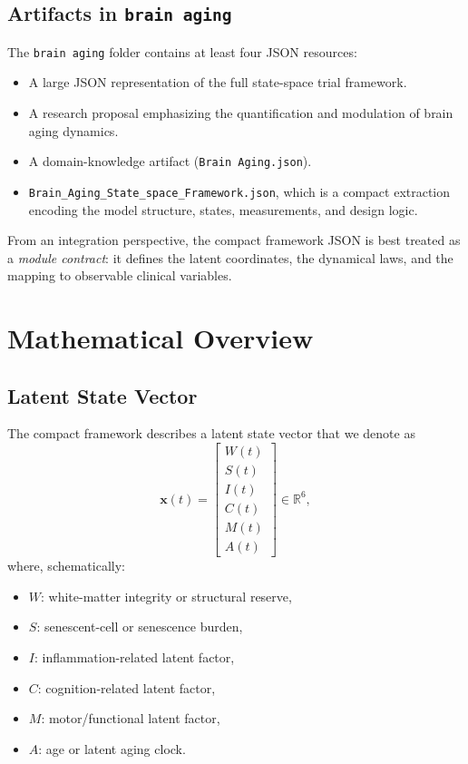 \documentclass[11pt]{article}
\begin{document}
\subsection{Artifacts in \texttt{brain aging}}

The \texttt{brain aging} folder contains at least four JSON resources:
\begin{itemize}[noitemsep]
  \item A large JSON representation of the full state-space trial framework.
  \item A research proposal emphasizing the quantification and modulation of brain
        aging dynamics.
  \item A domain-knowledge artifact (\texttt{Brain Aging.json}).
  \item \texttt{Brain\_Aging\_State\_space\_Framework.json}, which is a compact
        extraction encoding the model structure, states, measurements, and design
        logic.
\end{itemize}

From an integration perspective, the compact framework JSON is best treated as a
\emph{module contract}: it defines the latent coordinates, the dynamical laws, and
the mapping to observable clinical variables.

\section{Mathematical Overview}

\subsection{Latent State Vector}

The compact framework describes a latent state vector that we denote as
\[
  \bm{x}(t) =
  \begin{bmatrix}
    W(t) \\
    S(t) \\
    I(t) \\
    C(t) \\
    M(t) \\
    A(t)
  \end{bmatrix} \in \mathbb{R}^{6},
\]
where, schematically:
\begin{itemize}[noitemsep]
  \item \(W\): white-matter integrity or structural reserve,
  \item \(S\): senescent-cell or senescence burden,
  \item \(I\): inflammation-related latent factor,
  \item \(C\): cognition-related latent factor,
  \item \(M\): motor/functional latent factor,
  \item \(A\): age or latent aging clock.
\end{itemize}
\end{document}
